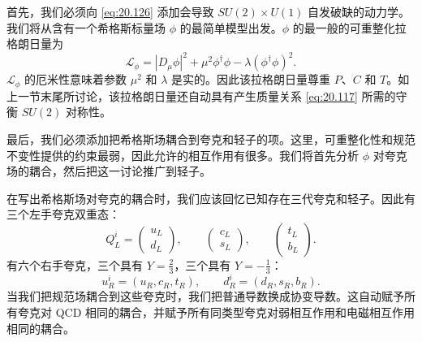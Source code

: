 首先，我们必须向 \eqref{eq:20.126} 添加会导致 $SU(2)\times U(1)$ 自发破缺的动力学。我们将从含有一个希格斯标量场 $\phi$ 的最简单模型出发。$\phi$ 的最一般的可重整化拉格朗日量为
\begin{equation}
  \mathcal{L}_{\phi} = |D_\mu\phi|^2 + \mu^2\phi^{\dagger}\phi
    - \lambda(\phi^{\dagger}\phi)^2 .
  \label{eq:20.130}
\end{equation}
$\mathcal{L}_{\phi}$ 的厄米性意味着参数 $\mu^2$ 和 $\lambda$ 是实的。因此该拉格朗日量尊重 $P$、$C$ 和 $T$。如上一节末尾所讨论，该拉格朗日量还自动具有产生质量关系 \eqref{eq:20.117} 所需的守衡 $SU(2)$ 对称性。

最后，我们必须添加把希格斯场耦合到夸克和轻子的项。这里，可重整化性和规范不变性提供的约束最弱，因此允许的相互作用有很多。我们将首先分析 $\phi$ 对夸克场的耦合，然后把这一讨论推广到轻子。

在写出希格斯场对夸克的耦合时，我们应该回忆已知存在三代夸克和轻子。因此有三个左手夸克双重态：
\begin{equation}
  Q^i_L = \begin{pmatrix}u_L\\ d_L\end{pmatrix},\qquad
  \begin{pmatrix}c_L\\ s_L\end{pmatrix},\qquad
  \begin{pmatrix}t_L\\ b_L\end{pmatrix} .
  \label{eq:20.131}
\end{equation}
有六个右手夸克，三个具有 $Y = \frac{2}{3}$，三个具有 $Y = -\frac{1}{3}$：
\begin{equation}
  u^i_R = (u_R, c_R, t_R),\qquad
  d^i_R = (d_R, s_R, b_R) .
  \label{eq:20.132}
\end{equation}
当我们把规范场耦合到这些夸克时，我们把普通导数换成协变导数。这自动赋予所有夸克对 QCD 相同的耦合，并赋予所有同类型夸克对弱相互作用和电磁相互作用相同的耦合。

